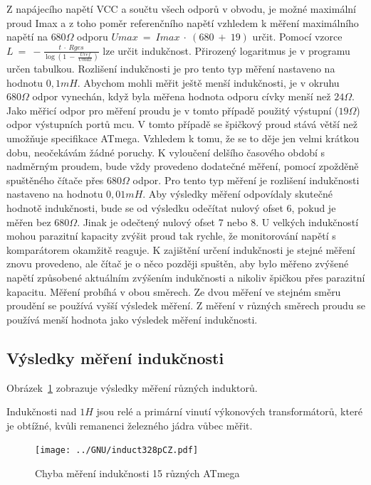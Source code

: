 Z napájecího napětí VCC a součtu všech odporů v obvodu, je možné maximální proud Imax a
z toho poměr referenčního napětí vzhledem k měření maximálního napětí na \(680\Omega\) odporu
\(Umax~=~Imax~\cdot~(680~+~19)\) určit.
Pomocí vzorce \(L~=~-\frac{t~\cdot~Rges}{\log{(1~-~\frac{Uref}{Umax})}}\) lze určit indukčnost.
Přirozený logaritmus je v programu určen tabulkou.
Rozlišení indukčnosti je pro tento typ měření nastaveno na hodnotu \(0,1mH\).
Abychom mohli měřit ještě menší indukčnosti, je v okruhu \(680\Omega\) odpor vynechán,
když byla měřena hodnota odporu cívky menší než \(24\Omega\).
Jako měřicí odpor pro měření proudu je v tomto případě použitý výstupní (\(19\Omega\)) odpor výstupních portů mcu. V tomto případě se špičkový proud stává větší než umožňuje specifikace ATmega.
Vzhledem k tomu, že se to děje jen velmi krátkou dobu, neočekávám žádné poruchy.
K vyloučení delšího časového období s nadměrným proudem, bude vždy provedeno dodatečné měření, pomocí
zpožděně spuštěného čítače přes \(680\Omega\) odpor.
Pro tento typ měření je rozlišení indukčnosti nastaveno na hodnotu \(0,01mH\).
Aby výsledky měření odpovídaly skutečné hodnotě indukčnosti, bude se od výsledku odečítat nulový ofset 6,
pokud je měřen bez \(680\Omega\). Jinak je odečtený nulový ofset 7 nebo 8.
U velkých indukčností mohou parazitní kapacity zvýšit proud tak rychle, že
monitorování napětí s komparátorem okamžitě reaguje.
K zajištění určení indukčnosti je stejné měření znovu provedeno, ale čítač je o něco později spuštěn,
aby bylo měřeno zvýšené napětí způsobené aktuálním zvýšením indukčnosti a nikoliv
špičkou přes parazitní kapacitu.
Měření probíhá v obou směrech. Ze dvou měření ve stejném směru proudění se používá vyšší výsledek měření.
Z měření v různých směrech proudu se používá menší hodnota jako výsledek měření indukčnosti.

\subsection{Výsledky měření indukčnosti}
Obrázek~\ref{fig:Induct328p} zobrazuje výsledky měření různých induktorů.

Indukčnosti nad \(1 H\) jsou relé a primární vinutí výkonových transformátorů, které je obtížné, kvůli
remanenci železného jádra vůbec měřit.

\begin{figure}[H]
\centering
\texttt{[image: ../GNU/induct328pCZ.pdf]}
\caption{Chyba měření indukčnosti 15 různých ATmega}
\label{fig:Induct328p}
\end{figure}

